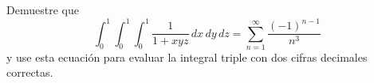 \item Demuestre que
    \[ \int_0^1 \int_0^1 \int_0^1 \frac{1}{1 + xyz} \, dx \, dy \, dz = \sum_{n=1}^\infty \frac{(-1)^{n-1}}{n^3} \]
    y use esta ecuación para evaluar la integral triple con dos cifras decimales correctas.
